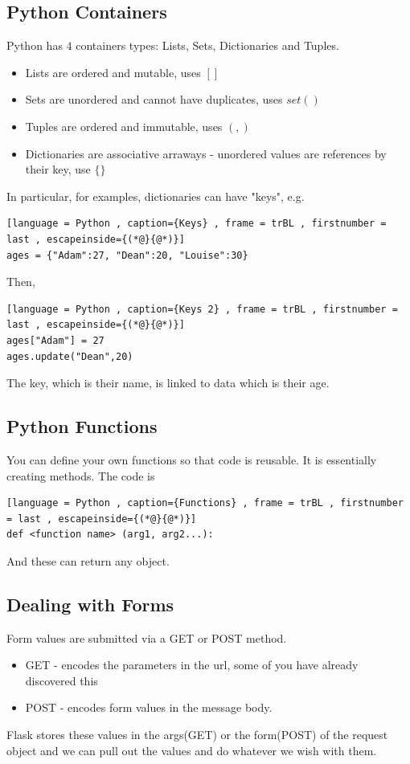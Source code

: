 \documentclass[a4paper]{article}
\theoremstyle{plain}
\theoremstyle{definition}
\theoremstyle{remark}
\begin{document}
\begin{flushleft}
\subsection{Python Containers}
Python has $4$ containers types: Lists, Sets, Dictionaries and Tuples.
\begin{itemize}
	\item Lists are ordered and mutable, uses $[]$
	\item Sets are unordered and cannot have duplicates, uses $set\left(  \right) $ 
	\item Tuples are ordered and immutable, uses $(,)$ 
	\item Dictionaries are associative arraways - unordered values are references by their key, use $\{\}$
\end{itemize}
In particular, for examples, dictionaries can have "keys", e.g.
\begin{lstlisting}[language = Python , caption={Keys} , frame = trBL , firstnumber = last , escapeinside={(*@}{@*)}]
ages = {"Adam":27, "Dean":20, "Louise":30}
\end{lstlisting}
Then,
\begin{lstlisting}[language = Python , caption={Keys 2} , frame = trBL , firstnumber = last , escapeinside={(*@}{@*)}]
ages["Adam"] = 27
ages.update("Dean",20)
\end{lstlisting}
The key, which is their name, is linked to data which is their age.
\subsection{Python Functions}
You can define your own functions so that code is reusable. It is essentially creating methods. The code is
\begin{lstlisting}[language = Python , caption={Functions} , frame = trBL , firstnumber = last , escapeinside={(*@}{@*)}]
def <function name> (arg1, arg2...):
\end{lstlisting}
And these can return any object.
\subsection{Dealing with Forms}
Form values are submitted via a GET or POST method.
\begin{itemize}
	\item GET - encodes the parameters in the url, some of you have already discovered this
	\item POST - encodes form values in the message body.
\end{itemize}
Flask stores these values in the args(GET) or the form(POST) of the request object and we can pull out the values and do whatever we wish with them.

\end{flushleft}
\end{document}
